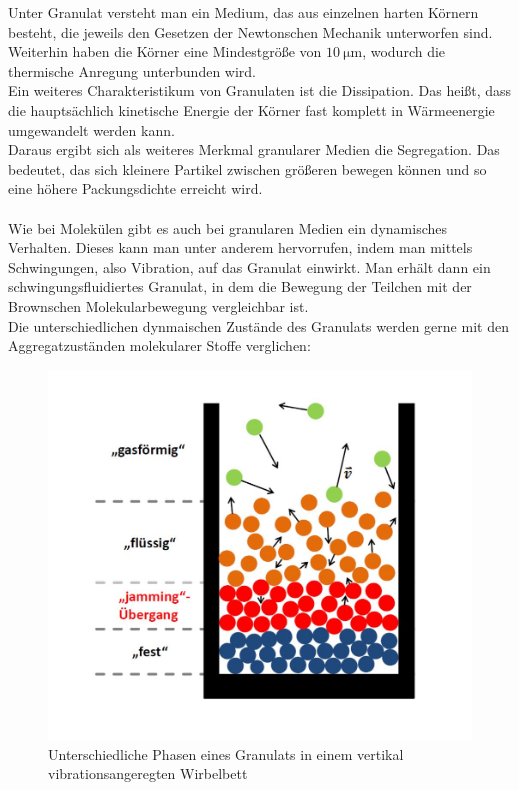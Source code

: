 Unter Granulat versteht man ein Medium, das aus einzelnen harten Körnern besteht, die jeweils den Gesetzen der Newtonschen Mechanik unterworfen sind. Weiterhin haben die Körner eine Mindestgröße von $\SI{10}{\micro\meter}$, wodurch die thermische Anregung unterbunden wird. \\
Ein weiteres Charakteristikum von Granulaten ist die Dissipation. Das heißt, dass die hauptsächlich kinetische Energie der Körner fast komplett in Wärmeenergie umgewandelt werden kann. \cite{DLRWebsite} \\
Daraus ergibt sich als weiteres Merkmal granularer Medien die Segregation. Das bedeutet, das sich kleinere Partikel zwischen größeren bewegen können und so eine höhere Packungsdichte erreicht wird. \cite{PhysikimKontext} \\
\hfill \\ 
Wie bei Molekülen gibt es auch bei granularen Medien ein dynamisches Verhalten. Dieses kann man unter anderem hervorrufen, indem man mittels Schwingungen, also Vibration, auf das Granulat einwirkt. Man erhält dann ein schwingungsfluidiertes Granulat, in dem die Bewegung der Teilchen mit der Brownschen Molekularbewegung vergleichbar ist. \\
Die unterschiedlichen dynmaischen Zustände des Granulats werden gerne mit den Aggregatzuständen molekularer Stoffe verglichen:


\begin{center}
\begin{figure}[h]
	\includegraphics[scale=0.45]{Einleitung_1.jpg}
	\caption{Unterschiedliche Phasen eines Granulats in einem vertikal vibrationsangeregten Wirbelbett  \cite{Darmstadt2015}}
\end{figure}	
\end{center}

